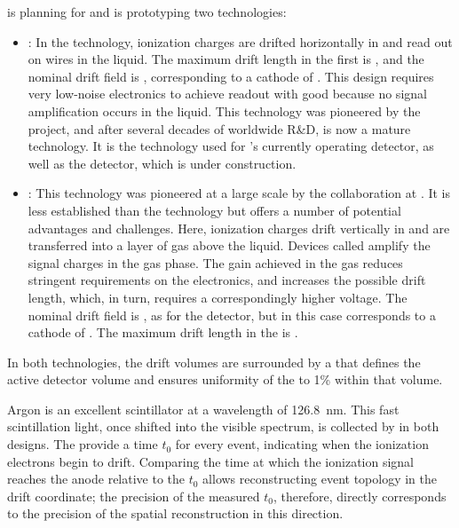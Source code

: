  is planning for and is prototyping two  technologies:
\begin{itemize}
\item {}: In the  technology, ionization charges are drifted horizontally in  and read out on wires in the liquid.  The maximum drift length in the first   is \spmaxdrift, and the nominal drift field is \spmaxfield, corresponding to a cathode  of \sptargetdriftvoltpos. This design requires very low-noise electronics to achieve readout with good  because no signal amplification occurs in the liquid. This technology was pioneered by the  project, and after several decades of worldwide R\&D, is now a mature technology. It is the technology used for 's currently operating  detector, as well as the  detector, which is under construction. 

\item {}: This technology was pioneered at a large scale by the  collaboration at . It is less established than the  technology but offers a number of potential advantages and challenges. Here, ionization charges drift vertically in  and are transferred into a layer of gas above the liquid. Devices called  amplify the signal charges  in the gas phase. The gain achieved in the gas reduces stringent requirements on the electronics, and increases the possible drift length, which, in turn, requires a correspondingly higher voltage. The nominal drift field is \dpnominaldriftfield, as for the  detector, but in this case corresponds to a cathode  of \dptargetdriftvoltpos.
The maximum drift length in the  is \dpmaxdrift{}.  
\end{itemize}
In both technologies, the drift volumes are surrounded by a  that defines the active detector volume and ensures uniformity of the \efield to 1\% within that volume.

Argon is an excellent scintillator at a wavelength of \SI{126.8}{\nano\meter}. This fast scintillation light, once shifted into the visible spectrum, is collected by  in both designs. The  provide a time $t_{0}$ for every event, indicating when the ionization electrons begin to drift. Comparing the time at which the ionization signal reaches the anode relative to the $t_{0}$ allows reconstructing event topology in the drift coordinate; the precision of the measured $t_{0}$, therefore, directly corresponds to the precision of the spatial reconstruction in this direction. 

